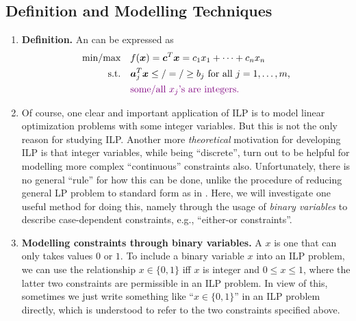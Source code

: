 \subsection{Definition and Modelling Techniques}
\begin{enumerate}
\item \textbf{Definition.} An  can be
expressed as
\begin{align*}
\text{min/max}\quad&f(\vect{x})=\vect{c}^{T}\vect{x}=c_1x_1+\dotsb+c_nx_n \\
\text{s.t.}\quad&\vect{a}_j^{T}\vect{x}\le/=/\ge b_j \text{ for all
\(j=1,\dotsc,m\),} \\
&\vc{\text{some/all \(x_j\)'s are integers.}}
\end{align*}
\item Of course, one clear and important application of ILP is to model
linear optimization problems with some integer variables. But this is not the
only reason for studying ILP. Another more \emph{theoretical} motivation for
developing ILP is that integer variables, while being ``discrete'', turn out
to be helpful for modelling more complex ``continuous'' constraints also.
Unfortunately, there is no general ``rule'' for how this can be done, unlike
the procedure of reducing general LP problem to standard form as in
. Here, we will investigate one useful method
for doing this, namely through the usage of \emph{binary variables} to describe
case-dependent constraints, e.g., ``either-or constraints''.

\item \textbf{Modelling constraints through binary variables.} A  \(x\) is one that can only takes values \(0\) or \(1\). To include a
binary variable \(x\) into an ILP problem, we can use the relationship
\(x\in\{0,1\}\) iff \(x\) is integer and \(0\le x\le 1\), where the latter two
constraints are permissible in an ILP problem. In view of this, sometimes we
just write something like ``\(x\in\{0,1\}\)'' in an ILP problem directly, which
is understood to refer to the two constraints specified above.


\end{enumerate}
